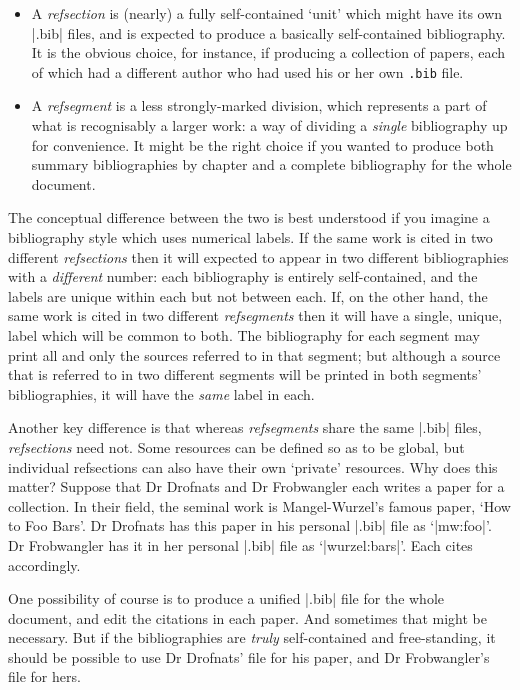 \begin{itemize}
\item A \emph{refsection} is (nearly) a fully self-contained `unit'
  which might have its own |.bib| files, and is expected to produce a
  basically self-contained bibliography. It is the obvious choice, for
  instance, if producing a collection of papers, each of which had a
  different author who had used his or her own \texttt{.bib} file.
\item A \emph{refsegment} is a less strongly-marked division, which
  represents a part of what is recognisably a larger work: a way of
  dividing a \emph{single} bibliography up for convenience. It might
  be the right choice if you wanted to produce both summary
  bibliographies by chapter and a complete bibliography for the whole
  document.
\end{itemize}
The conceptual difference between the two is best understood if you
imagine a bibliography style which uses numerical labels. If the same
work is cited in two different \emph{refsections} then it will
expected to appear in two different bibliographies with a
\emph{different} number: each bibliography is entirely self-contained,
and the labels are unique within each but not between each. If, on the
other hand, the same work is cited in two different \emph{refsegments}
then it will have a single, unique, label which will be common to
both.  The bibliography for each segment may print all and only the
sources referred to in that segment; but although a source that is
referred to in two different segments will be printed in both
segments' bibliographies, it will have the \emph{same} label in each.

Another key difference is that whereas \emph{refsegments} share the
same |.bib| files, \emph{refsections} need not.  Some resources can be
defined so as to be global, but individual refsections can also have
their own `private' resources. Why does this matter? Suppose that Dr
Drofnats and Dr Frobwangler each writes a paper for a collection. In
their field, the seminal work is Mangel-Wurzel's famous paper, `How to
Foo Bars'. Dr Drofnats has this paper in his personal |.bib| file as
`|mw:foo|'. Dr Frobwangler has it in her personal |.bib| file as
`|wurzel:bars|'. Each cites accordingly.

One possibility of course is to produce a unified |.bib| file for the
whole document, and edit the citations in each paper. And sometimes
that might be necessary. But if the bibliographies are \emph{truly}
self-contained and free-standing, it should be possible to use Dr
Drofnats' file for his paper, and Dr Frobwangler's file for hers.

